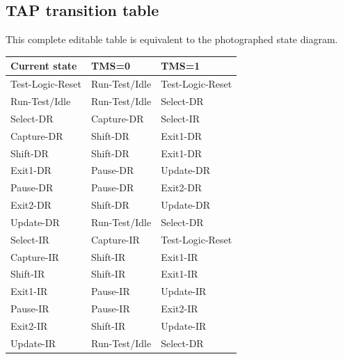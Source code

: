 \documentclass[11pt,a4paper]{article}
\begin{document}
\subsection*{TAP transition table}
This complete editable table is equivalent to the photographed state diagram.
\begin{center}\small
\begin{tabular}{lll}\toprule Current state&TMS=0&TMS=1\\\midrule
Test-Logic-Reset&Run-Test/Idle&Test-Logic-Reset\\
Run-Test/Idle&Run-Test/Idle&Select-DR\\
Select-DR&Capture-DR&Select-IR\\
Capture-DR&Shift-DR&Exit1-DR\\
Shift-DR&Shift-DR&Exit1-DR\\
Exit1-DR&Pause-DR&Update-DR\\
Pause-DR&Pause-DR&Exit2-DR\\
Exit2-DR&Shift-DR&Update-DR\\
Update-DR&Run-Test/Idle&Select-DR\\
Select-IR&Capture-IR&Test-Logic-Reset\\
Capture-IR&Shift-IR&Exit1-IR\\
Shift-IR&Shift-IR&Exit1-IR\\
Exit1-IR&Pause-IR&Update-IR\\
Pause-IR&Pause-IR&Exit2-IR\\
Exit2-IR&Shift-IR&Update-IR\\
Update-IR&Run-Test/Idle&Select-DR\\\bottomrule
\end{tabular}\end{center}
\end{document}

